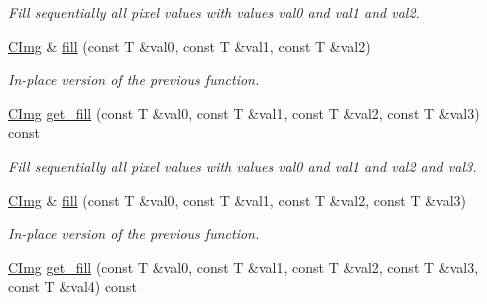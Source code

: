 \begin{DoxyCompactItemize}
\begin{DoxyCompactList}\small\item\em Fill sequentially all pixel values with values {\itshape val0} and {\itshape val1} and {\itshape val2}. \end{DoxyCompactList}\item 
\hypertarget{structcimg__library_1_1_c_img_a6fc4d10118a359cd983c75d102b5fea2}{\hyperlink{structcimg__library_1_1_c_img}{C\-Img} \& \hyperlink{structcimg__library_1_1_c_img_a6fc4d10118a359cd983c75d102b5fea2}{fill} (const T \&val0, const T \&val1, const T \&val2)}\label{structcimg__library_1_1_c_img_a6fc4d10118a359cd983c75d102b5fea2}

\begin{DoxyCompactList}\small\item\em In-\/place version of the previous function. \end{DoxyCompactList}\item 
\hypertarget{structcimg__library_1_1_c_img_a766f580fec2d712d2339b046e13f60b8}{\hyperlink{structcimg__library_1_1_c_img}{C\-Img} \hyperlink{structcimg__library_1_1_c_img_a766f580fec2d712d2339b046e13f60b8}{get\-\_\-fill} (const T \&val0, const T \&val1, const T \&val2, const T \&val3) const }\label{structcimg__library_1_1_c_img_a766f580fec2d712d2339b046e13f60b8}

\begin{DoxyCompactList}\small\item\em Fill sequentially all pixel values with values {\itshape val0} and {\itshape val1} and {\itshape val2} and {\itshape val3}. \end{DoxyCompactList}\item 
\hypertarget{structcimg__library_1_1_c_img_a3806a6320480cd62070062bb1b5dce66}{\hyperlink{structcimg__library_1_1_c_img}{C\-Img} \& \hyperlink{structcimg__library_1_1_c_img_a3806a6320480cd62070062bb1b5dce66}{fill} (const T \&val0, const T \&val1, const T \&val2, const T \&val3)}\label{structcimg__library_1_1_c_img_a3806a6320480cd62070062bb1b5dce66}

\begin{DoxyCompactList}\small\item\em In-\/place version of the previous function. \end{DoxyCompactList}\item 
\hypertarget{structcimg__library_1_1_c_img_ac705148d7cf7c78877524ae4bff26355}{\hyperlink{structcimg__library_1_1_c_img}{C\-Img} \hyperlink{structcimg__library_1_1_c_img_ac705148d7cf7c78877524ae4bff26355}{get\-\_\-fill} (const T \&val0, const T \&val1, const T \&val2, const T \&val3, const T \&val4) const }\label{structcimg__library_1_1_c_img_ac705148d7cf7c78877524ae4bff26355}


\end{DoxyCompactItemize}
